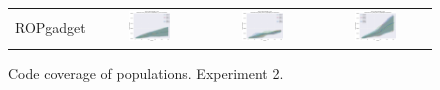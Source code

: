 \documentclass{article}
\begin{document}
\begin{landscape}
\begin{figure}[t]
\begin{center}
\begin{tabular}{c c c c}
    ROPgadget & \includegraphics[align=c,width=0.42\textwidth]{cc/e2/4} & \includegraphics[align=c,width=0.42\textwidth]{cc/e2/5} & \includegraphics[align=c,width=0.42\textwidth]{cc/e2/6} \\
\end{tabular}
\end{center}
\caption{Code coverage of populations. Experiment 2.}
\label{fig:cc/e2}
\end{figure}


\end{landscape}
\end{document}
